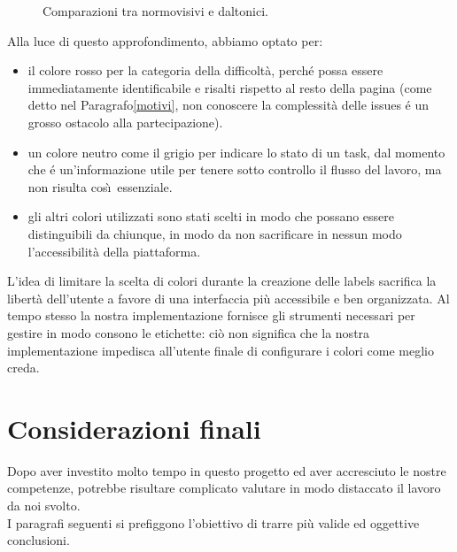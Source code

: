 \documentclass[12pt]{article} %
\begin{document}
\begin{figure}[H]
\caption{Comparazioni tra normovisivi e daltonici.}
\label{fig:daltonici}
\end{figure}

Alla luce di questo approfondimento, abbiamo optato per:
\begin{itemize}
\item il colore rosso per la categoria della difficolt\`a, perch\'e possa essere immediatamente identificabile e risalti rispetto al resto della pagina (come detto nel Paragrafo\ref{motivi}, non conoscere la complessit\`a delle issues \'e un grosso ostacolo alla partecipazione).
\item un colore neutro come il grigio per indicare lo stato di un task, dal momento che \'e un'informazione utile per tenere sotto controllo il flusso del lavoro, ma non risulta cos\`\i\ essenziale.
\item gli altri colori utilizzati sono stati scelti in modo che possano essere distinguibili da chiunque, in modo da non sacrificare in nessun modo l'accessibilit\`a della piattaforma.
\end{itemize}
L'idea di limitare la scelta di colori durante la creazione delle labels sacrifica la libert\`a dell'utente a favore di una interfaccia pi\`u accessibile e ben organizzata. Al tempo stesso la nostra implementazione fornisce gli strumenti necessari per gestire in modo consono le etichette: ci\`o non significa che la nostra implementazione impedisca all'utente finale di configurare i colori come meglio creda.

\newpage

\section{Considerazioni finali}
Dopo aver investito molto tempo in questo progetto ed aver accresciuto le nostre competenze, potrebbe risultare complicato valutare in modo distaccato il lavoro da noi svolto.\\
I paragrafi seguenti si prefiggono l'obiettivo di trarre pi\`u valide ed oggettive conclusioni.
\end{document}
